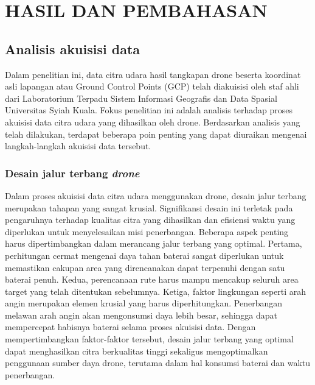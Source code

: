 \chapter{HASIL DAN PEMBAHASAN}

\section{Analisis akuisisi data}

Dalam penelitian ini, data citra udara hasil tangkapan drone beserta koordinat asli lapangan atau Ground Control Points (GCP) telah diakuisisi oleh staf ahli dari Laboratorium Terpadu Sistem Informasi Geografis dan Data Spasial Universitas Syiah Kuala. Fokus penelitian ini adalah analisis terhadap proses akuisisi data citra udara yang dihasilkan oleh drone. Berdasarkan analisis yang telah dilakukan, terdapat beberapa poin penting yang dapat diuraikan mengenai langkah-langkah akuisisi data tersebut.

\subsection{Desain jalur terbang \textit{drone}}

Dalam proses akuisisi data citra udara menggunakan drone, desain jalur terbang merupakan tahapan yang sangat krusial. Signifikansi desain ini terletak pada pengaruhnya terhadap kualitas citra yang dihasilkan dan efisiensi waktu yang diperlukan untuk menyelesaikan misi penerbangan. Beberapa aspek penting harus dipertimbangkan dalam merancang jalur terbang yang optimal. Pertama, perhitungan cermat mengenai daya tahan baterai sangat diperlukan untuk memastikan cakupan area yang direncanakan dapat terpenuhi dengan satu baterai penuh. Kedua, perencanaan rute harus mampu mencakup seluruh area target yang telah ditentukan sebelumnya. Ketiga, faktor lingkungan seperti arah angin merupakan elemen krusial yang harus diperhitungkan. Penerbangan melawan arah angin akan mengonsumsi daya lebih besar, sehingga dapat mempercepat habisnya baterai selama proses akuisisi data. Dengan mempertimbangkan faktor-faktor tersebut, desain jalur terbang yang optimal dapat menghasilkan citra berkualitas tinggi sekaligus mengoptimalkan penggunaan sumber daya drone, terutama dalam hal konsumsi baterai dan waktu penerbangan.

